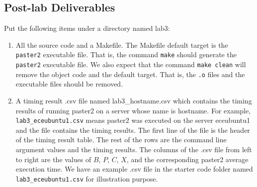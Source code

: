 \subsection{Post-lab Deliverables}
\label{sec:lab3:postlab}
Put the following items under a directory named lab3:
\begin{enumerate}
\item All the source code and a Makefile. The Makefile default target is the \verb+paster2+ executable file. That is, the command \verb+make+ should generate the \verb+paster2+ executable file. We also expect that the command \verb+make clean+ will remove the object code and the default target. That is, the \verb+.o+ files and the executable files should be removed.
\item A timing result .csv file named lab3\_hostname.csv 
  which contains the timing results of running paster2 on a server whose name is hostname. For example, \verb+lab3_eceubuntu1.csv+ means paster2 was executed on the server eceubuntu1 and the file contains the timing results.
  The first line of the file is the header of the timing result table. The rest of the rows are the command line argument values and the timing results. The columns of the .csv file from left to right are the values of $B$, $P$, $C$, $X$, and the corresponding paster2 average execution time. We have an example .csv file in the starter code folder named \verb+lab3_eceubuntu1.csv+ for illustration purpose.


\end{enumerate}
